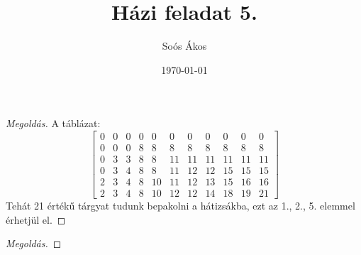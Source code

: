 \documentclass{homework}
\author{Soós Ákos}
\date{\today}
\title{Házi feladat 5.}
\begin{document}
 
\maketitle
{}

\hfill \break

\begin{problem}
    \begin{proof}[Megoldás]
        A táblázat:
        $$
        \begin{bmatrix}
             0 &  0 &  0 &  0 &  0 &  0 &  0 &  0 &  0 &  0 &  0 \\
             0 &  0 &  0 &  8 &  8 &  8 &  8 &  8 &  8 &  8 &  8 \\
             0 &  3 &  3 &  8 &  8 & 11 & 11 & 11 & 11 & 11 & 11 \\
             0 &  3 &  4 &  8 &  8 & 11 & 12 & 12 & 15 & 15 & 15 \\
             2 &  3 &  4 &  8 & 10 & 11 & 12 & 13 & 15 & 16 & 16 \\
             2 &  3 &  4 &  8 & 10 & 12 & 12 & 14 & 18 & 19 & 21
        \end{bmatrix}
        $$
        Tehát 21 értékű tárgyat tudunk bepakolni a hátizsákba, ezt az 1., 2., 5. elemmel érhetjül el.
    \end{proof}
\end{problem}
\hfill \break

\begin{problem}
    \begin{proof}[Megoldás]
        
    \end{proof}
\end{problem}
\end{document}
